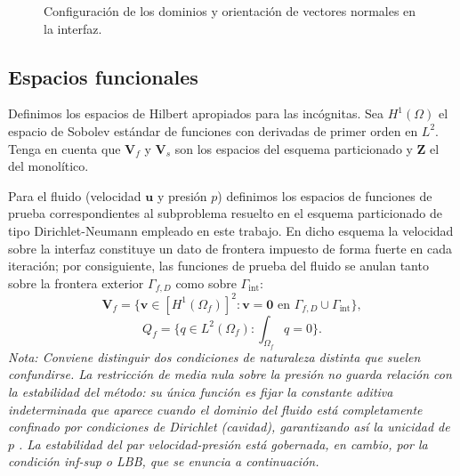 \documentclass[12pt, letterpaper]{report}
\theoremstyle{definition}
\begin{document}
\begin{figure}[H]
    \centering
    \caption{Configuración de los dominios y orientación de vectores normales en la interfaz.}
    \label{fig:dominios_fsi}
\end{figure}

\subsection{Espacios funcionales}
\label{subsec:espacios_funcionales}

Definimos los espacios de Hilbert apropiados para las incógnitas. Sea $H^1(\Omega)$ el espacio de Sobolev estándar de funciones con derivadas de primer orden en $L^2$. Tenga en cuenta que $\mathbf{V}_f$ y $\mathbf{V}_s$ son los espacios del esquema particionado y $\mathbf{Z}$ el del monolítico.

Para el fluido (velocidad $\mathbf{u}$ y presión $p$) definimos los espacios de funciones de prueba correspondientes al subproblema resuelto en el esquema particionado de tipo Dirichlet-Neumann empleado en este trabajo. En dicho esquema la velocidad sobre la interfaz constituye un dato de frontera impuesto de forma fuerte en cada iteración; por consiguiente, las funciones de prueba del fluido se anulan tanto sobre la frontera exterior $\Gamma_{f,D}$ como sobre $\Gamma_{\text{int}}$:
\[
\mathbf{V}_f = \{ \mathbf{v} \in [H^1(\Omega_f)]^2 : \mathbf{v} = \mathbf{0} \text{ en } \Gamma_{f,D} \cup \Gamma_{\text{int}} \}, 
\]
\[
Q_f = \{ q \in L^2(\Omega_f) : \textstyle\int_{\Omega_f} q = 0 \}.
\]
\textit{Nota: Conviene distinguir dos condiciones de naturaleza distinta que suelen confundirse. La restricción de media nula sobre la presión no guarda relación con la estabilidad del método: su única función es fijar la constante aditiva indeterminada que aparece cuando el dominio del fluido está completamente confinado por condiciones de Dirichlet (cavidad), garantizando así la unicidad de $p$ \cite{brezzi1991mixed,girault1986finite}. La estabilidad del par velocidad-presión está gobernada, en cambio, por la condición inf-sup o LBB, que se enuncia a continuación.}
\end{document}
